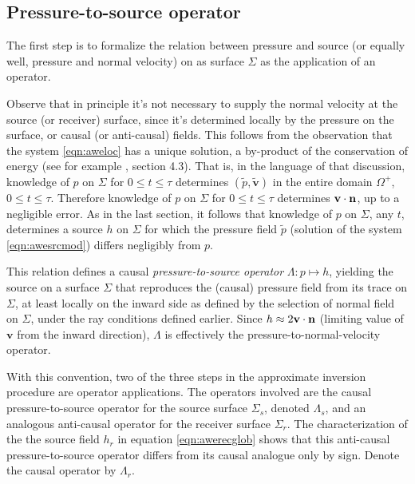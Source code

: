 \documentclass[12pt]{geophysics}
\newcommand{\bv}{\mathbf{v}}
\begin{document}
\subsection{Pressure-to-source operator}
The first step is to formalize the relation between pressure and
source (or equally well, pressure and normal velocity) on as surface
$\Sigma$ as the application of an operator.

Observe that in principle it's not necessary to
supply the normal velocity at the source (or receiver) surface, since
it's determined locally by the pressure on the surface, or causal (or
anti-causal) fields. This follows from the observation that the system
\ref{eqn:aweloc} has a unique solution, a by-product of the
conservation of energy (see for example \cite{Lax:PDENotes}, section
4.3). That is, in the language of that discussion, knowledge of $p$ on
$\Sigma$ for $0\le t \le \tau$ determines $(\tilde{p},\tilde{\bv})$ in
the entire domain $\Omega^+$, $0\le t \le \tau$. Therefore knowledge
of $p$ on $\Sigma$ for $0\le t \le \tau$ determines
$\bv \cdot {\bf n}$, up to a negligible error. As in the last section,
it follows that knowledge of $p$ on $\Sigma$, any $t$, determines a
source $h$ on $\Sigma$ for which the pressure field $\tilde{p}$
(solution of the system \ref{eqn:awesrcmod}) differs negligibly from
$p$.

This relation defines a causal {\em pressure-to-source operator}
$\Lambda: p \mapsto h$, yielding the source on a surface $\Sigma$ that
reproduces the (causal) pressure field from its trace on $\Sigma$, at
least locally on the inward side as defined by the selection of normal
field on $\Sigma$, under the ray conditions defined earlier. Since
$h \approx 2 \bv \cdot {\bf n}$ (limiting value of $\bv$ from the
inward direction), $\Lambda$ is effectively the
pressure-to-normal-velocity operator.

With this convention, two of the three steps in
the approximate inversion procedure are operator applications. The
operators involved are the causal pressure-to-source operator for the
source surface $\Sigma_s$, denoted $\Lambda_s$, and an analogous
anti-causal operator for the receiver surface $\Sigma_r$. 
The characterization of the the source field $h_r$ in equation
\ref{eqn:awerecglob} shows that this anti-causal pressure-to-source
operator differs from its causal analogue only by sign. Denote the
causal operator by $\Lambda_r$.
\end{document}
